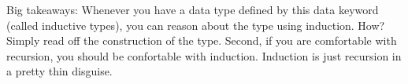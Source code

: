 \documentclass{lecturenotes}
\begin{document}
\begin{center}
\begin{code}
%
\>[8]\AgdaSpace{}%
\AgdaSpace{}%
\AgdaSpace{}%
\AgdaSpace{}%
\AgdaSymbol{(}\AgdaSpace{}%
\AgdaSpace{}%
\AgdaSpace{}%
\AgdaSymbol{)}\AgdaSpace{}%
\AgdaSymbol{=}\AgdaSpace{}%
\AgdaSpace{}%
\AgdaSpace{}%
\AgdaSpace{}%
\AgdaSpace{}%
\AgdaSymbol{(}\AgdaSpace{}%
\AgdaSpace{}%
\AgdaSpace{}%
\AgdaSpace{}%
\AgdaSymbol{)}\AgdaSpace{}%
\AgdaSymbol{(}\AgdaSpace{}%
\AgdaSpace{}%
\AgdaSpace{}%
\AgdaSpace{}%
\AgdaSymbol{)}\<%
\end{code}
\end{center}

\noindent Big takeaways: Whenever you have a data type defined by this data keyword (called inductive types), you can reason about the type using induction.
How? Simply read off the construction of the type. 
Second, if you  are comfortable with recursion, you should be confortable with induction.
Induction is just recursion in a pretty thin disguise. 
\end{document}
